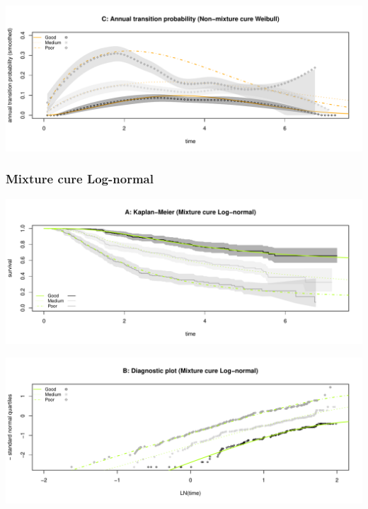 \documentclass[
]{article}
\begin{document}
\begin{flushleft}\includegraphics[height=0.25\textheight]{BC_OS_output/Images/Figure_cure_models-6} \end{flushleft}

\clearpage

\subsubsection{Mixture cure Log-normal}\label{mixture-cure-log-normal}

\begin{flushleft}\includegraphics[height=0.25\textheight]{BC_OS_output/Images/Figure_cure_models-7} \end{flushleft}

\begin{flushleft}\includegraphics[height=0.25\textheight]{BC_OS_output/Images/Figure_cure_models-8} \end{flushleft}
\end{document}
